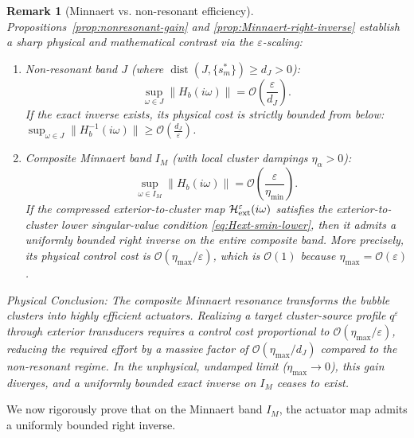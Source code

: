 \documentclass[11pt,a4paper]{article}
\numberwithin{equation}{section}
\newtheorem{remark}[theorem]{Remark}
\begin{document}
\begin{remark}[Minnaert vs. non-resonant efficiency]
\label{rem:clear-cut}
Propositions~\ref{prop:nonresonant-gain} and \ref{prop:Minnaert-right-inverse} establish a sharp physical and mathematical contrast via the $\varepsilon$-scaling:

\begin{enumerate}
 \item \textit{Non-resonant band $J$} (where $\operatorname{dist}(J, \{s_m^*\}) \ge d_J > 0$):
 \[
  \sup_{\omega\in J}\|H_b(i\omega)\| = \mathcal{O}\left(\frac{\varepsilon}{d_J}\right).
 \]
 If the exact inverse exists, its physical cost is strictly bounded from below: $\sup_{\omega\in J}\|H_b^{-1}(i\omega)\| \ge \mathcal{O}\left(\frac{d_J}{\varepsilon}\right)$.
 
 \item \textit{Composite Minnaert band $I_M$} (with local cluster dampings $\eta_\alpha>0$):
 \[
  \sup_{\omega\in I_M}\|H_b(i\omega)\| = \mathcal{O}\left(\frac{\varepsilon}{\eta_{\min}}\right).
 \]
 If the compressed exterior-to-cluster map $\mathcal H_{\rm ext}^\varepsilon(i\omega)$ satisfies the exterior-to-cluster lower singular-value condition \eqref{eq:Hext-smin-lower}, then it admits a uniformly bounded right inverse on the entire composite band. More precisely, its physical control cost is $\mathcal O(\eta_{\max}/\varepsilon)$, which is $\mathcal O(1)$ because $\eta_{\max}=\mathcal O(\varepsilon)$.
\end{enumerate}
\noindent
\textit{Physical Conclusion:} The composite Minnaert resonance transforms the bubble clusters into highly efficient actuators. Realizing a target cluster-source profile $q^\varepsilon$ through exterior transducers requires a control cost proportional to $\mathcal{O}(\eta_{\max}/\varepsilon)$, reducing the required effort by a massive factor of $\mathcal{O}(\eta_{\max}/d_J)$ compared to the non-resonant regime. In the unphysical, undamped limit ($\eta_{\max}\to0$), this gain diverges, and a uniformly bounded exact inverse on $I_M$ ceases to exist.
\end{remark}

\medskip

\noindent
We now rigorously prove that on the Minnaert band $I_M$, the actuator map admits a uniformly bounded right inverse.
\end{document}
